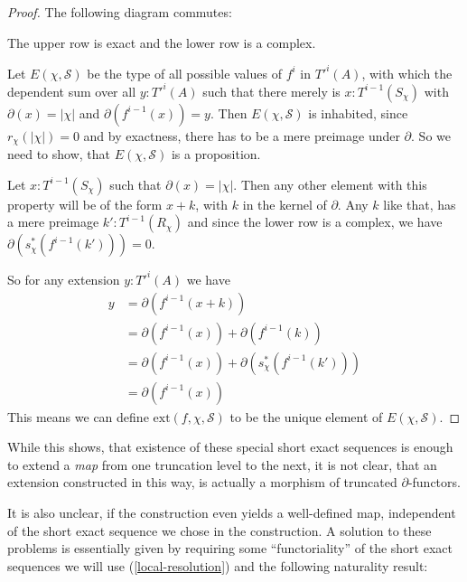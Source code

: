 \begin{proof}
  The following diagram commutes:
  \begin{center}
  \end{center}
  The upper row is exact and the lower row is a complex.

  Let $E(\chi,\mathcal{S})$ be the type of all possible values of $f^i$ in $T'^i(A)$,
  with which the dependent sum over all $y:T'^i(A)$ such that there merely is $x:T^{i-1}(S_\chi)$ with $\partial(x)=|\chi|$
  and $\partial(f^{i-1}(x))=y$.
  Then $E(\chi,\mathcal{S})$ is inhabited, since $r_\chi(|\chi|)=0$ and by exactness, there has to be a mere preimage under $\partial$.
  So we need to show, that $E(\chi,\mathcal{S})$ is a proposition.
  
  Let $x:T^{i-1}(S_\chi)$ such that $\partial(x)=|\chi|$.
  Then any other element with this property will be of the form $x+k$, with $k$ in the kernel of $\partial$.
  Any $k$ like that, has a mere preimage $k':T^{i-1}(R_\chi)$ and since the lower row is a complex, we have $\partial(s_\chi^\ast(f^{i-1}(k')))=0$.
  
  So for any extension $y:T'^{i}(A)$ we have
  \begin{align*}
    y &= \partial(f^{i-1}(x+k)) \\
      &= \partial(f^{i-1}(x))+\partial(f^{i-1}(k)) \\
      &= \partial(f^{i-1}(x))+\partial(s_\chi^\ast(f^{i-1}(k'))) \\
      &= \partial(f^{i-1}(x))
  \end{align*}
  This means we can define $\mathrm{ext}(f,\chi,\mathcal{S})$ to be the unique element of $E(\chi,\mathcal{S})$.
\end{proof}

While this shows, that existence of these special short exact sequences
is enough to extend a \emph{map} from one truncation level to the next,
it is not clear, that an extension constructed in this way,
is actually a morphism of truncated $\partial$-functors.

It is also unclear, if the construction even yields a well-defined map,
independent of the short exact sequence we chose in the construction.
A solution to these problems is essentially given by
requiring some ``functoriality'' of the short exact sequences we will use (\cref{local-resolution}) and
the following naturality result:

